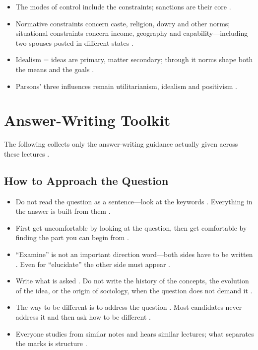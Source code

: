 \begin{QuickRevision}
\begin{itemize}
    \item The modes of control include the constraints; sanctions are their core .
    \item Normative constraints concern caste, religion, dowry and other norms; situational constraints concern income, geography and capability---including two spouses posted in different states .
    \item Idealism = ideas are primary, matter secondary; through it norms shape both the means and the goals .
    \item Parsons' three influences remain utilitarianism, idealism and positivism .
\end{itemize}
\end{QuickRevision}

\sectiondivider

\section{Answer-Writing Toolkit}
The following collects only the answer-writing guidance actually given across these lectures .

\subsection{How to Approach the Question}
\begin{itemize}
    \item Do not read the question as a sentence---look at the keywords . Everything in the answer is built from them .
    \item First get uncomfortable by looking at the question, then get comfortable by finding the part you can begin from .
    \item ``Examine'' is not an important direction word---both sides have to be written . Even for ``elucidate'' the other side must appear .
    \item Write what is asked . Do not write the history of the concepts, the evolution of the idea, or the origin of sociology, when the question does not demand it .
    \item The way to be different is to address the question . Most candidates never address it and then ask how to be different .
    \item Everyone studies from similar notes and hears similar lectures; what separates the marks is structure .
\end{itemize}

